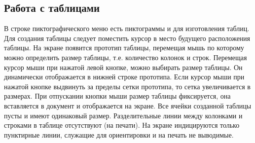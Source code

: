 \documentclass[a4paper]{article}
\begin{document}
\subsection{Работа с таблицами}
В строке пиктографического меню есть пиктограммы и для изготовления таблиц. Для создания таблицы следует поместить курсор в место будущего расположения таблицы. На экране появится прототип таблицы, перемещая мышь по которому можно определить размер таблицы, т.е. количество колонок и строк. Перемещая курсор мыши при нажатой левой кнопке, можно выбирать размер таблицы. Он динамически отображается в нижней строке прототипа. Если курсор мыши при нажатой кнопке выдвинуть за пределы сетки прототипа, то сетка увеличивается в размерах. При отпускании кнопки мыши размер таблицы фиксируется, она вставляется в документ и отображается на экране. Все ячейки созданной таблицы пусты и имеют одинаковый размер. Разделительные линии между колонками и строками в таблице отсутствуют (на печати). На экране индицируются только пунктирные линии, служащие для ориентировки и на печать не выводимые.
\end{document}
